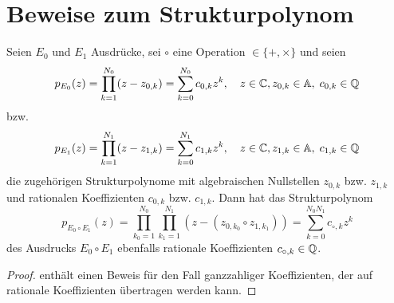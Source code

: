 %
%
\pagebreak
\section{Beweise zum Strukturpolynom}\label{se:Anhang}


\begin{theorem}
Seien $E_0$ und $E_1$ Ausdrücke,
sei $\circ$ eine Operation $\in\{+,\times\}$
und seien
\begin{equation*}
  p_{E_0}(z) = \prod_{k=1}^{N_0} (z-z_{0,k}) = \sum_{k=0}^{N_0} c_{0,k} z^k
  ,\quad
  z\in\mathbb{C},z_{0,k}\in\mathbb{A},\;c_{0,k}\in\mathbb{Q}
\end{equation*}
bzw. 
\begin{equation*}
  p_{E_1}(z) = \prod_{k=1}^{N_1} (z-z_{1,k}) = \sum_{k=0}^{N_1} c_{1,k} z^k
  ,\quad
  z\in\mathbb{C},z_{1,k}\in\mathbb{A},\;c_{1,k}\in\mathbb{Q}
\end{equation*}
die zugehörigen Strukturpolynome 
mit algebraischen Nullstellen $z_{0,k}$ bzw. $z_{1,k}$
und rationalen Koeffizienten $c_{0,k}$ bzw. $c_{1,k}$.
Dann hat das Strukturpolynom
\begin{equation*}
  p_{E_0\circ E_1}(z) = \prod_{k_0=1}^{N_0}
                        \prod_{k_1=1}^{N_1}
                        (z-(z_{0,k_0}\circ z_{1,k_1}))
                      = \sum_{k=0}^{N_0N_1} c_{\circ,k} z^k
\end{equation*}
des Ausdrucks $E_0\circ E_1$ ebenfalls rationale Koeffizienten $c_{\circ,k}\in\mathbb{Q}$.
\begin{proof}
\cite{BFMS} enthält einen Beweis für den Fall ganzzahliger Koeffizienten,
der auf rationale Koeffizienten übertragen werden kann.
\end{proof}
\end{theorem}


